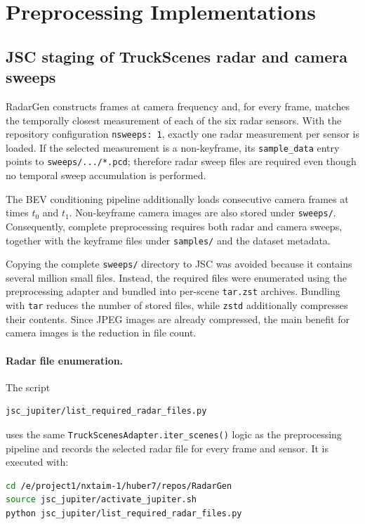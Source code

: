 \documentclass[11pt,a4paper]{article}
\begin{document}
\section{Preprocessing Implementations}

\subsection{JSC staging of TruckScenes radar and camera sweeps}

RadarGen constructs frames at camera frequency and, for every frame,
matches the temporally closest measurement of each of the six radar
sensors. With the repository configuration \texttt{nsweeps: 1},
exactly one radar measurement per sensor is loaded. If the selected
measurement is a non-keyframe, its \texttt{sample\_data} entry points
to \texttt{sweeps/.../*.pcd}; therefore radar sweep files are required
even though no temporal sweep accumulation is performed.

The BEV conditioning pipeline additionally loads consecutive camera
frames at times $t_0$ and $t_1$. Non-keyframe camera images are also
stored under \texttt{sweeps/}. Consequently, complete preprocessing
requires both radar and camera sweeps, together with the keyframe
files under \texttt{samples/} and the dataset metadata.

Copying the complete \texttt{sweeps/} directory to JSC was avoided
because it contains several million small files. Instead, the
required files were enumerated using the preprocessing adapter and
bundled into per-scene \texttt{tar.zst} archives. Bundling with
\texttt{tar} reduces the number of stored files, while \texttt{zstd}
additionally compresses their contents. Since JPEG images are already
compressed, the main benefit for camera images is the reduction in
file count.

\paragraph{Radar file enumeration.}

The script
\begin{lstlisting}
jsc_jupiter/list_required_radar_files.py
\end{lstlisting}
uses the same \texttt{TruckScenesAdapter.iter\_scenes()} logic as the
preprocessing pipeline and records the selected radar file for every
frame and sensor. It is executed with:
\begin{lstlisting}[language=bash]
cd /e/project1/nxtaim-1/huber7/repos/RadarGen
source jsc_jupiter/activate_jupiter.sh
python jsc_jupiter/list_required_radar_files.py
\end{lstlisting}
\end{document}
